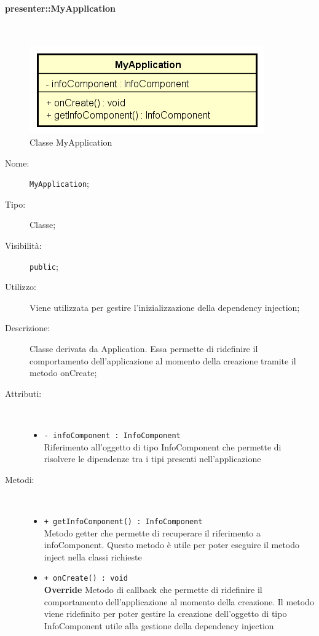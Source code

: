 \documentclass[../DefinizioneDiProdotto.tex]{subfiles}
\begin{document}
\paragraph{presenter::MyApplication}
\
\begin{figure}[H]
	\centering
	\includegraphics[width=\maxwidth]{img/MyApplication.png}
	\caption{Classe MyApplication}\label{fig:presenter::MyApplication} 
\end{figure}
\begin{description}
	\item[Nome:] \texttt{MyApplication};
	\item[Tipo:] Classe;
	\item[Visibilità:] \texttt{public};
	\item[Utilizzo:] Viene utilizzata per gestire l'inizializzazione della dependency injection;
	\item[Descrizione:] Classe derivata da Application. Essa permette di ridefinire il comportamento dell'applicazione al momento della creazione tramite il metodo onCreate;
	\item[Attributi:] \
	\begin{itemize}
		\item \texttt{- infoComponent : InfoComponent}\\
		Riferimento all'oggetto di tipo InfoComponent che permette di risolvere le dipendenze tra i tipi presenti nell'applicazione
		
	\end{itemize}
	\item[Metodi:] \
	\begin{itemize}
		\item \texttt{+ getInfoComponent() : InfoComponent}\\
		Metodo getter che permette di recuperare il riferimento a infoComponent. Questo metodo è utile per poter eseguire il metodo inject nella classi richieste
		\item \texttt{+ onCreate() : void}\\
		\textbf{Override} Metodo di callback che permette di ridefinire il comportamento dell'applicazione al momento della creazione. Il metodo viene ridefinito per poter gestire la creazione dell'oggetto di tipo InfoComponent utile alla gestione della dependency injection
	\end{itemize}
\end{description}
\end{document}
